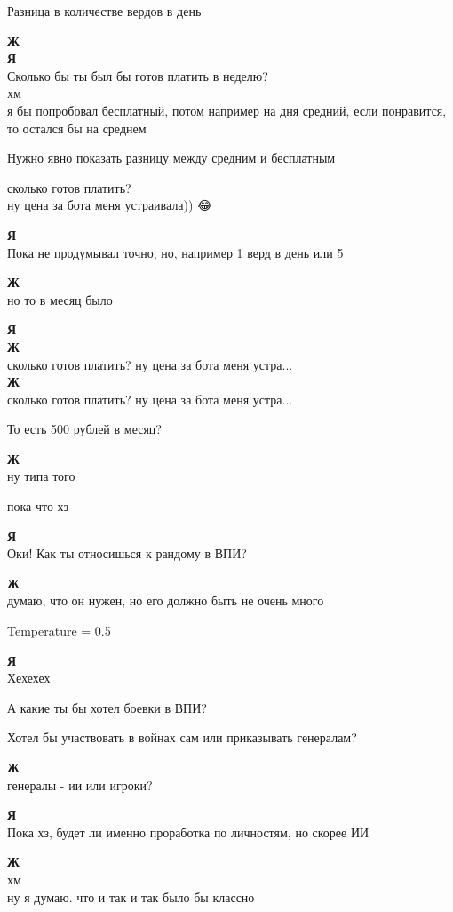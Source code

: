 Разница в количестве вердов в день

\textbf{Ж} \\
\textbf{Я} \\
Сколько бы ты был бы готов платить в неделю? \\
хм \\
я бы попробовал бесплатный, потом например на дня средний, если понравится, то остался бы на среднем

Нужно явно показать разницу между средним и бесплатным

сколько готов платить? \\
ну цена за бота меня устраивала)) 😂🎅

\textbf{Я} \\
Пока не продумывал точно, но, например 1 верд в день или 5

\textbf{Ж} \\
но то в месяц было

\textbf{Я} \\
\textbf{Ж} \\
сколько готов платить? ну цена за бота меня устра...\\
\textbf{Ж} \\
сколько готов платить? ну цена за бота меня устра...

То есть 500 рублей в месяц?

\textbf{Ж} \\
ну типа того

пока что хз

\textbf{Я} \\
Оки! Как ты относишься к рандому в ВПИ?

\textbf{Ж} \\
думаю, что он нужен, но его должно быть не очень много

Temperature = 0.5

\textbf{Я} \\
Хехехех

А какие ты бы хотел боевки в ВПИ?

Хотел бы участвовать в войнах сам или приказывать генералам?

\textbf{Ж} \\
генералы - ии или игроки?

\textbf{Я} \\
Пока хз, будет ли именно проработка по личностям, но скорее ИИ

\textbf{Ж} \\
хм\\

ну я думаю. что и так и так было бы классно

